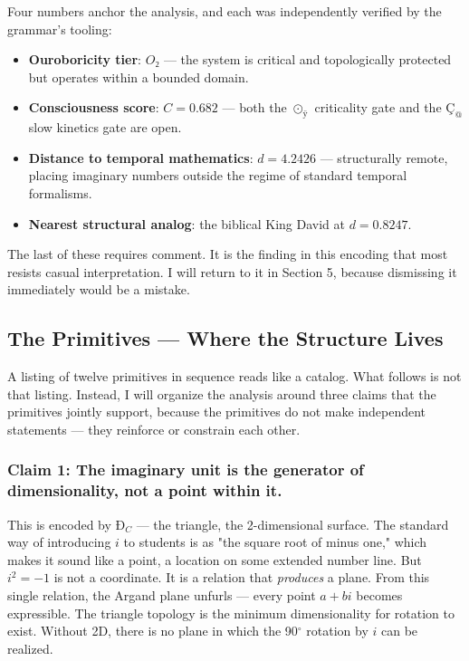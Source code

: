 \documentclass[12pt,a4paper]{article}
\begin{document}
Four numbers anchor the analysis, and each was independently verified by the grammar's tooling:

\begin{itemize}
    \item \textbf{Ouroboricity tier}: $O₂$ --- the system is critical and topologically protected but operates within a bounded domain.
    \item \textbf{Consciousness score}: $C = 0.682$ --- both the $⊙_{ÿ}$ criticality gate and the $Ç_{@}$ slow kinetics gate are open.
    \item \textbf{Distance to temporal mathematics}: $d = 4.2426$ --- structurally remote, placing imaginary numbers outside the regime of standard temporal formalisms.
    \item \textbf{Nearest structural analog}: the biblical King David at $d = 0.8247$.
\end{itemize}

The last of these requires comment. It is the finding in this encoding that most resists casual interpretation. I will return to it in Section 5, because dismissing it immediately would be a mistake.

\subsection{The Primitives --- Where the Structure Lives}

A listing of twelve primitives in sequence reads like a catalog. What follows is not that listing. Instead, I will organize the analysis around three claims that the primitives jointly support, because the primitives do not make independent statements --- they reinforce or constrain each other.

\subsubsection{Claim 1: The imaginary unit is the generator of dimensionality, not a point within it.}

This is encoded by $Ð_{C}$ --- the triangle, the 2-dimensional surface. The standard way of introducing $i$ to students is as "the square root of minus one," which makes it sound like a point, a location on some extended number line. But $i^2 = -1$ is not a coordinate. It is a relation that \emph{produces} a plane. From this single relation, the Argand plane unfurls --- every point $a + bi$ becomes expressible. The triangle topology is the minimum dimensionality for rotation to exist. Without 2D, there is no plane in which the 90$^{\circ}$ rotation by $i$ can be realized.
\end{document}
